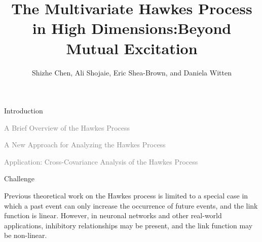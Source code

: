 \documentclass{beamer}		%
\title[The Multivariate Hawkes Process in High Dimensions:Beyond Mutual Excitation]{The Multivariate Hawkes Process in High Dimensions:Beyond Mutual Excitation}	%
\author[Shen Yuan]{Shizhe Chen, Ali Shojaie, Eric Shea-Brown, and Daniela Witten} %
\begin{document}


\newcommand{\light}[1]{\textcolor{gray}{#1}}

\begin{frame}	

\titlepage	%
	
\end{frame}	




\begin{frame}[noframenumbering]

\begin{itemize}

    \begin{LARGE}
    
    \item Introduction
    
    \item \light{A Brief Overview of the Hawkes Process}
    
    \item \light{A New Approach for Analyzing the Hawkes Process}
    
    \item \light{Application: Cross-Covariance Analysis of the Hawkes Process}

    \end{LARGE}
    
\end{itemize}
	
\end{frame}






\begin{frame}{Challenge}

Previous theoretical work on the Hawkes process is limited to a special case in which a past event can only increase the occurrence of future events, and the link function is linear. However, in neuronal networks and other real-world applications, inhibitory relationships may be present, and the link function may be non-linear.
    
\end{frame}
\end{document}

